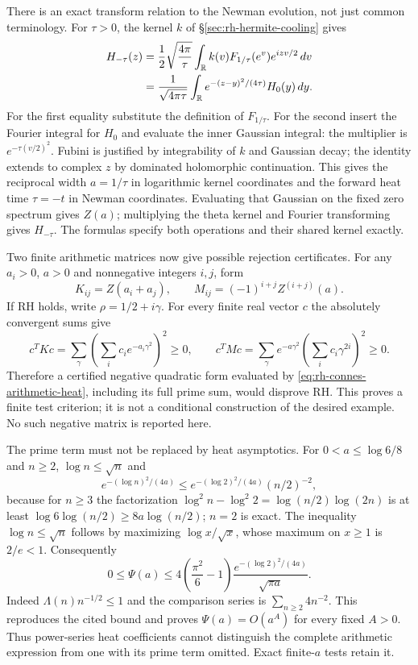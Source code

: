 There is an exact transform relation to the Newman evolution, not
just common terminology. For $\tau>0$, the kernel $k$ of
\S\ref{sec:rh-hermite-cooling} gives
\begin{align}
 H_{-\tau}(z)
 &=\frac12\sqrt{\frac{4\pi}{\tau}}
   \int_{\mathbb R}k(v)F_{1/\tau}(e^v)e^{izv/2}\,dv\notag\\
 &=\frac1{\sqrt{4\pi\tau}}\int_{\mathbb R}
       e^{-(z-y)^2/(4\tau)}H_0(y)\,dy.
 \label{eq:rh-connes-newman-gaussian}
\end{align}
For the first equality substitute the definition of $F_{1/\tau}$.
For the second insert the Fourier integral for $H_0$ and evaluate
the inner Gaussian integral: the multiplier is
$e^{-\tau(v/2)^2}$. Fubini is justified by integrability of $k$ and
Gaussian decay; the identity extends to complex $z$ by dominated
holomorphic continuation. This gives the reciprocal width
$a=1/\tau$ in logarithmic kernel coordinates and the forward heat
time $\tau=-t$ in Newman coordinates. Evaluating that Gaussian on
the fixed zero spectrum gives $Z(a)$; multiplying the theta kernel
and Fourier transforming gives $H_{-\tau}$. The formulas specify
both operations and their shared kernel exactly.

Two finite arithmetic matrices now give possible rejection
certificates. For any $a_i>0$, $a>0$ and nonnegative integers $i,j$,
form
\begin{equation}
 K_{ij}=Z(a_i+a_j),\qquad
 M_{ij}=(-1)^{i+j}Z^{(i+j)}(a).
 \label{eq:rh-connes-heat-matrices}
\end{equation}
If RH holds, write $\rho=1/2+i\gamma$. For every finite real vector
$c$ the absolutely convergent sums give
\[
 c^TKc=\sum_\gamma\left(\sum_i c_i e^{-a_i\gamma^2}\right)^2\ge0,
 \qquad
 c^TMc=\sum_\gamma e^{-a\gamma^2}
                  \left(\sum_i c_i\gamma^{2i}\right)^2\ge0.
\]
Therefore a certified negative quadratic form evaluated by
\eqref{eq:rh-connes-arithmetic-heat}, including its full prime sum,
would disprove RH. This proves a finite test criterion; it is not
a conditional construction of the desired example. No such
negative matrix is reported here.

The prime term must not be replaced by heat asymptotics. For
$0<a\le\log6/8$ and $n\ge2$, $\log n\le\sqrt n$ and
\[
 e^{-(\log n)^2/(4a)}
 \le e^{-(\log2)^2/(4a)}(n/2)^{-2},
\]
because for $n\ge3$ the factorization
$\log^2 n-\log^2 2=\log(n/2)\log(2n)$ is at least
$\log6\log(n/2)\ge8a\log(n/2)$; $n=2$ is exact.
The inequality $\log n\le\sqrt n$ follows by maximizing
$\log x/\sqrt x$, whose maximum on $x\ge1$ is $2/e<1$.
Consequently
\begin{equation}
 0\le\Psi(a)\le
 4\left(\frac{\pi^2}{6}-1\right)
 \frac{e^{-(\log2)^2/(4a)}}{\sqrt{\pi a}}.
 \label{eq:rh-heat-prime-flatness}
\end{equation}
Indeed $\Lambda(n)n^{-1/2}\le1$ and the comparison series is
$\sum_{n\ge2}4n^{-2}$. This reproduces the cited bound and proves
$\Psi(a)=O(a^A)$ for every fixed $A>0$. Thus power-series heat
coefficients cannot distinguish the complete arithmetic expression
from one with its prime term omitted. Exact finite-$a$ tests retain it.
